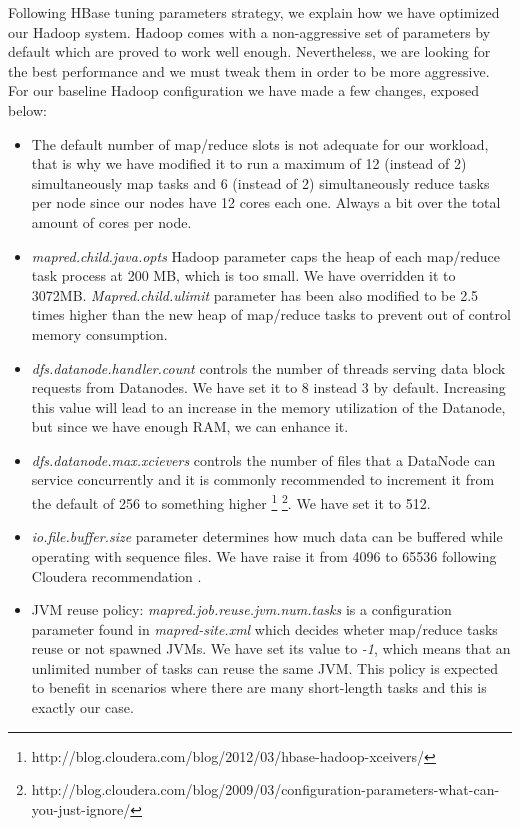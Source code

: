Following HBase tuning parameters strategy, we explain how we have optimized our Hadoop system. Hadoop comes with a non-aggressive set of parameters by default which are proved to work well enough. Nevertheless, we are looking for the best performance and we must tweak them in order to be more aggressive. For our baseline Hadoop configuration we have made a few changes, exposed below: 
\begin{itemize}
\item The default number of map/reduce slots is not adequate for our workload, that is why we have modified it to run a maximum of 12 (instead of 2) simultaneously map tasks and 6 (instead of 2) simultaneously reduce tasks per node since our nodes have 12 cores each one. Always a bit over the total amount of cores per node.
\item \textit{mapred.child.java.opts} Hadoop parameter caps the heap of each map/reduce task process at 200 MB, which is too small. We have overridden it to 3072MB. \textit{Mapred.child.ulimit} parameter has been also modified to be 2.5 times higher than the new heap of map/reduce tasks to prevent out of control memory consumption.
\item \textit{dfs.datanode.handler.count} controls the number of threads serving data block requests from Datanodes. We have set it to 8 instead 3 by default. Increasing this value will lead to an increase in the memory utilization of the Datanode, but since we have enough RAM, we can enhance it.
\item \textit{dfs.datanode.max.xcievers} controls the number of files that a DataNode can service concurrently and it is commonly recommended to increment it from the default of 256 to something higher \footnote{http://blog.cloudera.com/blog/2012/03/hbase-hadoop-xceivers/}  \footnote{\label{1}http://blog.cloudera.com/blog/2009/03/configuration-parameters-what-can-you-just-ignore/}. We have set it to 512.
\item \textit{io.file.buffer.size} parameter determines how much data can be buffered while operating with sequence files. We have raise it from 4096 to 65536 following Cloudera recommendation \footnotemark[1].
\item JVM reuse policy: \textit{mapred.job.reuse.jvm.num.tasks} is a configuration parameter found in \textit{mapred-site.xml} which decides wheter map/reduce tasks reuse or not spawned JVMs. We have set its value to \textit{-1}, which means that an unlimited number of tasks can reuse the same JVM. This policy is expected to benefit in scenarios where there are many short-length tasks and this is exactly our case.
\end{itemize}


